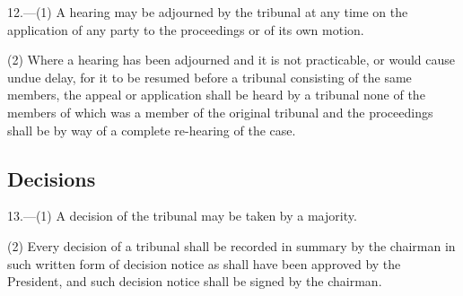 \documentclass[a4paper]{article}
\begin{document}
12.—(1) A hearing may be adjourned by the tribunal at any time on the application of any party to the proceedings or of its own motion.

(2) Where a hearing has been adjourned and it is not practicable, or would cause undue delay, for it to be resumed before a tribunal consisting of the same members, the appeal or application shall be heard by a tribunal none of the members of which was a member of the original tribunal and the proceedings shall be by way of a complete re-hearing of the case.

\subsection[13. Decisions]{Decisions}

13.—(1) A decision of the tribunal may be taken by a majority.

%
%

(2) Every decision of a tribunal shall be recorded in summary by the chairman in such written form of decision notice as shall have been approved by the President, and such decision notice shall be signed by the chairman.

%
\end{document}

